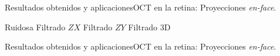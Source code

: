 \documentclass[fleqn,10pt]{beamer}
\begin{document}
\begin{frame}{Resultados obtenidos y aplicaciones}{OCT en la retina: Proyecciones \emph{en-face}.}
	
	\hspace*{0.5cm} Ruidosa \hspace*{0.7cm} Filtrado $ZX$ \hspace*{0.5cm} Filtrado $ZY$ \hspace*{0.6cm} Filtrado 3D 
\end{frame}

\begin{frame}{Resultados obtenidos y aplicaciones}{OCT en la retina: Proyecciones \emph{en-face}.}
		\vspace*{-0.2cm}
		\begin{center}
		\end{center}
\end{frame}

%	
\end{document}
